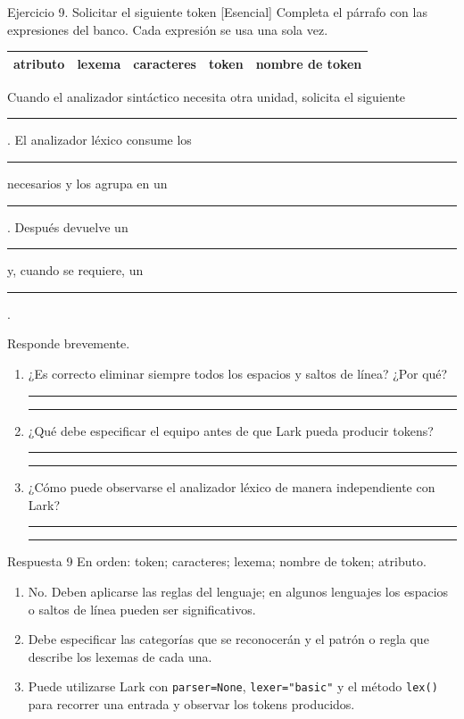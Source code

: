 \documentclass[11pt,spanish]{article}
\newcommand{\blank}[1][4cm]{\rule{#1}{0.4pt}}
\begin{document}
\begin{ejercicio}{Ejercicio 9. Solicitar el siguiente token \hfill {\small [Esencial]}}
Completa el párrafo con las expresiones del banco. Cada expresión se usa una sola vez.

\begin{center}
\small
\begin{tabular}{|c|c|c|c|c|}
\hline
atributo & lexema & caracteres & token & nombre de token \tabularnewline
\hline
\end{tabular}
\end{center}

Cuando el analizador sintáctico necesita otra unidad, solicita el siguiente \blank[3cm]. El analizador léxico consume los \blank[3cm] necesarios y los agrupa en un \blank[3cm]. Después devuelve un \blank[3.7cm] y, cuando se requiere, un \blank[3cm].

Responde brevemente.

\begin{enumerate}[leftmargin=*]
    \item ¿Es correcto eliminar siempre todos los espacios y saltos de línea? ¿Por qué?

    \ifrespuestas\else
    \blank[14cm]

    \blank[14cm]
    \fi

    \item ¿Qué debe especificar el equipo antes de que Lark pueda producir tokens?

    \ifrespuestas\else
    \blank[14cm]

    \blank[14cm]
    \fi

    \item ¿Cómo puede observarse el analizador léxico de manera independiente con Lark?

    \ifrespuestas\else
    \blank[14cm]

    \blank[14cm]
    \fi
\end{enumerate}
\end{ejercicio}

\ifrespuestas
\begin{respuesta}{Respuesta 9}
En orden: token; caracteres; lexema; nombre de token; atributo.

\begin{enumerate}[leftmargin=*]
    \item No. Deben aplicarse las reglas del lenguaje; en algunos lenguajes los espacios o saltos de línea pueden ser significativos.
    \item Debe especificar las categorías que se reconocerán y el patrón o regla que describe los lexemas de cada una.
    \item Puede utilizarse Lark con \texttt{parser=None}, \texttt{lexer="basic"} y el método \texttt{lex()} para recorrer una entrada y observar los tokens producidos.
\end{enumerate}
\end{respuesta}
\fi
\end{document}
